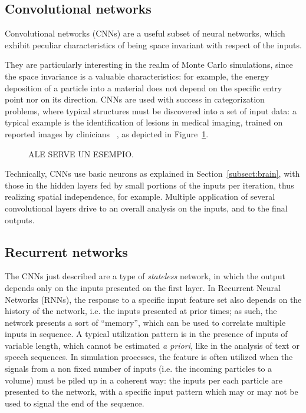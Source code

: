 \subsection{Convolutional networks}
Convolutional networks (CNNs) are a useful subset of neural networks, which exhibit peculiar characteristics of being space invariant with respect of the inputs.

They are particularly interesting in the realm of Monte Carlo simulations, since the space invariance is a valuable characteristics: for example, 
the energy deposition of a particle into a material
does not depend on the specific entry point nor on its direction.
CNNs are used with success in categorization problems, where typical structures must be discovered into a set of input data: a typical example is the identification of lesions in medical imaging, trained on reported images by clinicians ~\cite{cnnmedical}, as depicted in Figure~\ref{fig:cnnsmedical}.


 \begin{figure}[h]
    \centering
    \hfill
     \caption{ALE SERVE UN ESEMPIO.}
     \label{fig:cnnsmedical}

\end{figure}


Technically, CNNs use basic neurons as explained in Section~\ref{subsect:brain}, with those in the hidden layers fed by small portions of the inputs per iteration, thus realizing spatial independence, for example. Multiple application of several convolutional layers drive to an overall analysis on the inputs, and to the final outputs.

\subsection{Recurrent networks}
The CNNs just described are a type of \emph{stateless} network, in which the output depends only on the inputs presented on the first layer. In Recurrent Neural Networks (RNNs), the response to a specific input feature set also depends on the history of the network, i.e. the inputs presented at prior times; as such, the network presents a sort of ``memory'', which can be used to correlate multiple inputs in sequence. A typical utilization pattern is in the presence of inputs of variable length, which cannot be estimated \emph{a priori}, like in the analysis of text or speech sequences. 
In simulation processes, the feature is often utilized when the signals from a non fixed number of inputs (i.e. the incoming particles to a volume) must be piled up in a coherent way: the inputs per each particle are presented to the network, with a specific input pattern which may or may not be used to signal the end of the sequence. %

